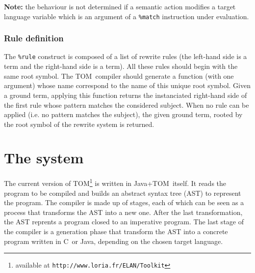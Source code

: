 \documentclass[a4paper]{article}
\newcommand{\TOM}{\textsf{TOM}}
\newcommand{\C}{\textsf{C}}
\newcommand{\Java}{\textsf{Java}}
\begin{document}
\noindent
\textbf{Note:} the behaviour is not determined if a semantic action
modifies a target language variable which is an argument of a
\texttt{\%match} instruction under evaluation.

\subsubsection{Rule definition}

The \texttt{\%rule} construct is composed of a list of rewrite rules
(the left-hand side is a term and the right-hand side is a term).
All these rules should begin with the same root symbol. The \TOM\
compiler should generate a function (with one argument) whose name
correspond to the name of this unique root symbol.
Given a ground term, applying this function returns the instanciated
right-hand side of the first rule whose pattern matches the considered 
subject.
When no rule can be applied (i.e. no pattern matches the subject),
the given ground term, rooted by the root symbol of the rewrite system
is returned.

\section{The system}

The current version of \TOM\footnote{available at
  \texttt{http://www.loria.fr/ELAN/Toolkit}} is written in
\Java+\TOM\ itself. 
It reads the program to be compiled and builds an abstract syntax tree
(AST) to represent the program.
The compiler is made up of stages, each of which can be seen as a
process that transforms the AST into a new one. After the last transformation,
the AST reprents a program closed to an imperative program.
The last stage of the compiler is a generation phase that transform
the AST into a concrete program written in \C\ or \Java, depending 
on the chosen target language.

\end{document}
